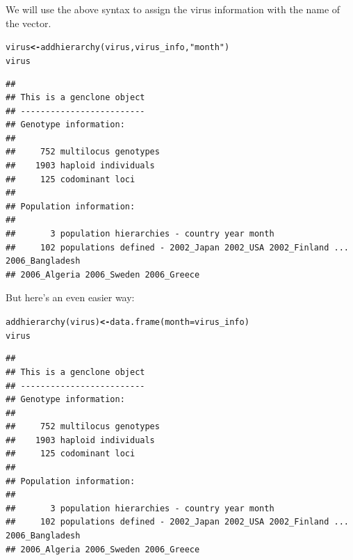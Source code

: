 \documentclass[letterpaper]{article}\usepackage[]{graphicx}\usepackage[]{color}
\makeatletter
\newcommand{\hlstr}[1]{\textcolor[rgb]{0.651,0.522,0}{#1}}%
\newcommand{\hlstd}[1]{\textcolor[rgb]{0,0,0}{#1}}%
\newcommand{\hlkwb}[1]{\textcolor[rgb]{0.502,0.502,0.753}{\textbf{#1}}}%
\newcommand{\hlkwc}[1]{\textcolor[rgb]{0,0.502,0.753}{#1}}%
\newcommand{\hlkwd}[1]{\textcolor[rgb]{0,0.267,0.4}{#1}}%
\newenvironment{kframe}{%
 \def\at@end@of@kframe{}%
 \ifinner\ifhmode%
  \def\at@end@of@kframe{\end{minipage}}%
  \begin{minipage}{\columnwidth}%
 \fi\fi%
 \def\FrameCommand##1{\hskip\@totalleftmargin \hskip-\fboxsep
 \colorbox{shadecolor}{##1}\hskip-\fboxsep
     \hskip-\linewidth \hskip-\@totalleftmargin \hskip\columnwidth}%
 \MakeFramed {\advance\hsize-\width
   \@totalleftmargin\z@ \linewidth\hsize
   \@setminipage}}%
 {\par\unskip\endMakeFramed%
 \at@end@of@kframe}
\newenvironment{knitrout}{}{} %
\makeatother
\begin{document}
\noindent
We will use the above syntax to assign the virus information with the name of
the vector.
\begin{knitrout}\footnotesize
{}\color{fgcolor}\begin{kframe}
\begin{alltt}
\hlstd{virus} \hlkwb{<-} \hlkwd{addhierarchy}\hlstd{(virus, virus_info,} \hlstr{"month"}\hlstd{)}
\hlstd{virus}
\end{alltt}
\end{kframe}
\end{knitrout}

\begin{knitrout}\footnotesize
{}\color{fgcolor}\begin{kframe}
\begin{verbatim}
## 
## This is a genclone object
## -------------------------
## Genotype information:
## 
##     752 multilocus genotypes
##    1903 haploid individuals
##     125 codominant loci
## 
## Population information:
## 
##       3 population hierarchies - country year month
##     102 populations defined - 2002_Japan 2002_USA 2002_Finland ... 2006_Bangladesh 
## 2006_Algeria 2006_Sweden 2006_Greece
\end{verbatim}
\end{kframe}
\end{knitrout}

\noindent
But here's an even easier way:
\begin{knitrout}\footnotesize
{}\color{fgcolor}\begin{kframe}
\begin{alltt}
\hlkwd{addhierarchy}\hlstd{(virus)} \hlkwb{<-} \hlkwd{data.frame}\hlstd{(}\hlkwc{month} \hlstd{= virus_info)}
\hlstd{virus}
\end{alltt}
\begin{verbatim}
## 
## This is a genclone object
## -------------------------
## Genotype information:
## 
##     752 multilocus genotypes
##    1903 haploid individuals
##     125 codominant loci
## 
## Population information:
## 
##       3 population hierarchies - country year month
##     102 populations defined - 2002_Japan 2002_USA 2002_Finland ... 2006_Bangladesh 
## 2006_Algeria 2006_Sweden 2006_Greece
\end{verbatim}
\end{kframe}
\end{knitrout}
\end{document}
